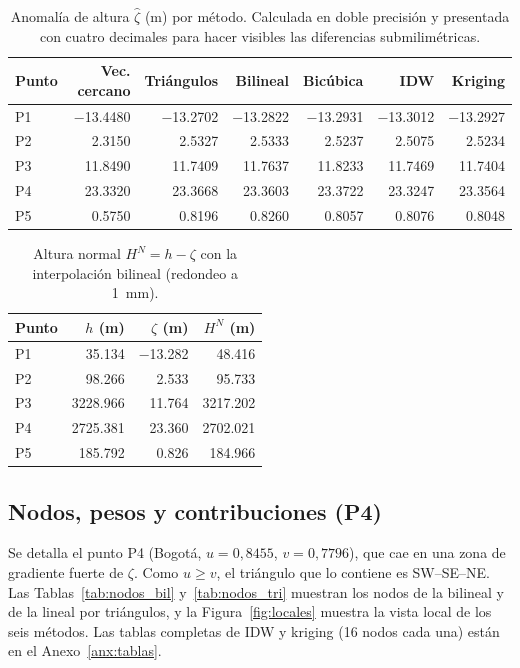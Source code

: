 \documentclass[11pt,letterpaper]{article}
\begin{document}
\begin{table}[H]
\centering
\caption{Anomalía de altura $\hat\zeta$ (m) por método. Calculada en doble precisión y
presentada con cuatro decimales para hacer visibles las diferencias submilimétricas.}
\label{tab:zeta}
\small
\begin{tabular}{@{}lrrrrrr@{}}
\toprule
Punto & Vec. cercano & Triángulos & Bilineal & Bicúbica & IDW & Kriging \\
\midrule
P1 & \num{-13.4480} & \num{-13.2702} & \num{-13.2822} & \num{-13.2931} & \num{-13.3012} & \num{-13.2927} \\
P2 & \num{2.3150} & \num{2.5327} & \num{2.5333} & \num{2.5237} & \num{2.5075} & \num{2.5234} \\
P3 & \num{11.8490} & \num{11.7409} & \num{11.7637} & \num{11.8233} & \num{11.7469} & \num{11.7404} \\
P4 & \num{23.3320} & \num{23.3668} & \num{23.3603} & \num{23.3722} & \num{23.3247} & \num{23.3564} \\
P5 & \num{0.5750} & \num{0.8196} & \num{0.8260} & \num{0.8057} & \num{0.8076} & \num{0.8048} \\
\bottomrule
\end{tabular}
\end{table}

\begin{table}[H]
\centering
\caption{Altura normal $H^N=h-\zeta$ con la interpolación bilineal (redondeo a \SI{1}{mm}).}
\label{tab:hn}
\begin{tabular}{@{}lrrr@{}}
\toprule
Punto & $h$ (m) & $\zeta$ (m) & $H^N$ (m) \\
\midrule
P1 & \num{35.134} & \num{-13.282} & \num{48.416} \\
P2 & \num{98.266} & \num{2.533} & \num{95.733} \\
P3 & \num{3228.966} & \num{11.764} & \num{3217.202} \\
P4 & \num{2725.381} & \num{23.360} & \num{2702.021} \\
P5 & \num{185.792} & \num{0.826} & \num{184.966} \\
\bottomrule
\end{tabular}
\end{table}

\subsection{Nodos, pesos y contribuciones (P4)}
Se detalla el punto P4 (Bogotá, $u=0{,}8455$, $v=0{,}7796$), que cae en una zona de
gradiente fuerte de $\zeta$. Como $u\ge v$, el triángulo que lo contiene es SW--SE--NE.
Las Tablas~\ref{tab:nodos_bil} y~\ref{tab:nodos_tri} muestran los nodos de la bilineal y
de la lineal por triángulos, y la Figura~\ref{fig:locales} muestra la vista local de los
seis métodos. Las tablas completas de IDW y kriging (16 nodos cada una) están en el
Anexo~\ref{anx:tablas}.
\end{document}

